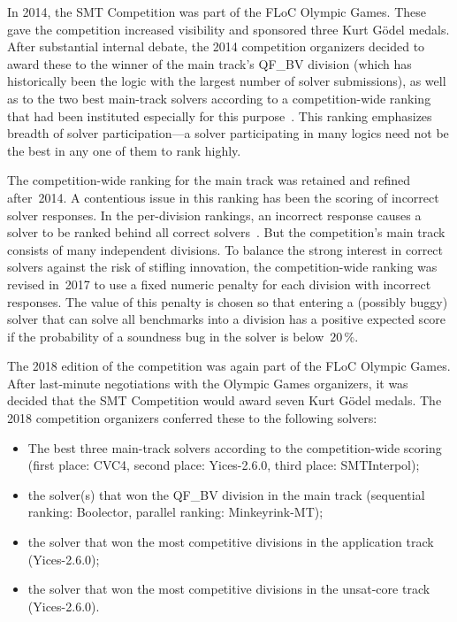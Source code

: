 \documentclass[twoside,11pt]{article}
\begin{document}
In 2014, the SMT Competition was part of the FLoC Olympic Games.
These gave the competition increased visibility and sponsored three
Kurt G\"odel medals.  After substantial internal debate, the 2014
competition organizers decided to award these to the winner of the
main track's QF\_BV division (which has historically been the logic
with the largest number of solver submissions), as well as to the two
best main-track solvers according to a competition-wide ranking that
had been instituted especially for this
purpose~\cite{DBLP:journals/jsat/CokDW14}.  This ranking emphasizes
breadth of solver participation---a solver participating in many
logics need not be the best in any one of them to rank highly.

The competition-wide ranking for the main track was retained and
refined after~2014.  A contentious issue in this ranking has been the
scoring of incorrect solver responses.  In the per-division rankings,
an incorrect response causes a solver to be ranked behind all correct
solvers~\cite{rules18}.  But the competition's main track consists of
many independent divisions.  To balance the strong interest in correct
solvers against the risk of stifling innovation, the competition-wide
ranking was revised in~2017 to use a fixed numeric penalty for each
division with incorrect responses.  The value of this penalty is
chosen so that entering a (possibly buggy) solver that can solve all
benchmarks into a division has a positive expected score if the
probability of a soundness bug in the solver is below~$20\,\%$.

The 2018 edition of the competition was again part of the FLoC Olympic
Games.  After last-minute negotiations with the Olympic Games
organizers, it was decided that the SMT Competition would award seven
Kurt G\"odel medals.  The 2018 competition organizers conferred these
to the following solvers:
\begin{itemize}
\item The best three main-track solvers according to the
  competition-wide scoring (first place: CVC4, second place:
  Yices-2.6.0, third place: SMTInterpol);
\item the solver(s) that won the QF\_BV division in the main track
  (sequential ranking: Boolector, parallel ranking: Minkeyrink-MT);
\item the solver that won the most competitive divisions in the
  application track (Yices-2.6.0);
\item the solver that won the most competitive divisions in the
  unsat-core track (Yices-2.6.0).
\end{itemize}
\end{document}
